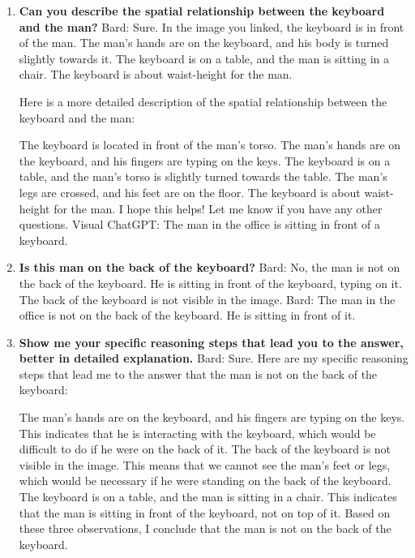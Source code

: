     \begin{enumerate}
        \item \textbf{Can you describe the spatial relationship between the keyboard and the man?}
        \subitem Bard: 
        Sure. In the image you linked, the keyboard is in front of the man. The man's hands are on the keyboard, and his body is turned slightly towards it. The keyboard is on a table, and the man is sitting in a chair. The keyboard is about waist-height for the man.

        Here is a more detailed description of the spatial relationship between the keyboard and the man:

        The keyboard is located in front of the man's torso.
        The man's hands are on the keyboard, and his fingers are typing on the keys.
        The keyboard is on a table, and the man's torso is slightly turned towards the table.
        The man's legs are crossed, and his feet are on the floor.
        The keyboard is about waist-height for the man.
        I hope this helps! Let me know if you have any other questions.
        \subitem Visual ChatGPT: The man in the office is sitting in front of a keyboard.
        \item \textbf{Is this man on the back of the keyboard?}
        \subitem Bard: 
        No, the man is not on the back of the keyboard. He is sitting in front of the keyboard, typing on it. The back of the keyboard is not visible in the image.
        \subitem Bard: The man in the office is not on the back of the keyboard. He is sitting in front of it.
        \item \textbf{Show me your specific reasoning steps that lead you to the answer, better in detailed explanation.}
        \subitem Bard: 
        Sure. Here are my specific reasoning steps that lead me to the answer that the man is not on the back of the keyboard:
        
        The man's hands are on the keyboard, and his fingers are typing on the keys. This indicates that he is interacting with the keyboard, which would be difficult to do if he were on the back of it.
        The back of the keyboard is not visible in the image. This means that we cannot see the man's feet or legs, which would be necessary if he were standing on the back of the keyboard.
        The keyboard is on a table, and the man is sitting in a chair. This indicates that the man is sitting in front of the keyboard, not on top of it.
        Based on these three observations, I conclude that the man is not on the back of the keyboard.
        

\end{enumerate}
